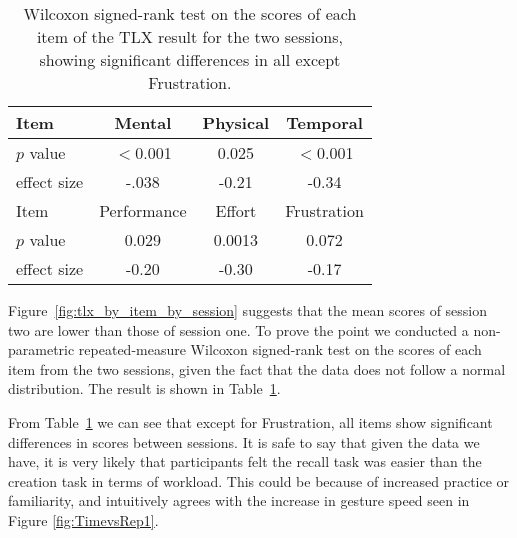 \documentclass{sig-alternate-10pt}
\begin{document}
\begin{table}[!h]
\begin{center}
  \begin{tabular}{ l | c  c  c}
  \hline
	Item & Mental & Physical & Temporal\\ \hline
	$p$ value & $<$0.001 & 0.025 & $<$0.001\\
	effect size & -.038 & -0.21 & -0.34\\	\hline
	Item & Performance & Effort & Frustration\\ \hline
	$p$ value & 0.029 & 0.0013 & 0.072 \\
	effect size & -0.20 & -0.30 & -0.17 \\	
\end{tabular}
\caption{Wilcoxon signed-rank test on the scores of each item of the TLX result for the two sessions, showing significant differences in all except Frustration.}
    \label{tab:wilcoxon_tlx}
    \vspace{-11pt}
\end{center}
\end{table}

Figure~\ref{fig:tlx_by_item_by_session} suggests that the mean scores of session two are lower than those of session one. To prove the point we conducted a non-parametric repeated-measure Wilcoxon signed-rank test on the scores of each item from the two sessions, given the fact that the data does not follow a normal distribution. The result is shown in Table~\ref{tab:wilcoxon_tlx}.



From Table~\ref{tab:wilcoxon_tlx} we can see that except for Frustration, all items show significant differences in scores between sessions. It is safe to say that given the data we have, it is very likely that participants felt the recall task was easier than the creation task in terms of workload. This could be because of increased practice or familiarity, and intuitively agrees with the increase in gesture speed seen in Figure \ref{fig:TimevsRep1}.
\end{document}
